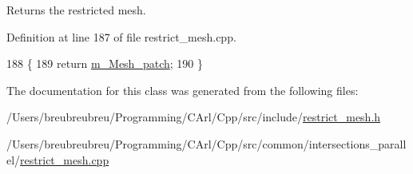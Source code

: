 Returns the restricted mesh. 



Definition at line 187 of file restrict\+\_\+mesh.\+cpp.


\begin{DoxyCode}
188 \{
189     \textcolor{keywordflow}{return} \hyperlink{classcarl_1_1_patch__construction_a4dfae5a2c4a983ac31dacec1cdb29d11}{m\_Mesh\_patch};
190 \}
\end{DoxyCode}


The documentation for this class was generated from the following files\+:\begin{DoxyCompactItemize}
\item 
/\+Users/breubreubreu/\+Programming/\+C\+Arl/\+Cpp/src/include/\hyperlink{restrict__mesh_8h}{restrict\+\_\+mesh.\+h}\item 
/\+Users/breubreubreu/\+Programming/\+C\+Arl/\+Cpp/src/common/intersections\+\_\+parallel/\hyperlink{restrict__mesh_8cpp}{restrict\+\_\+mesh.\+cpp}\end{DoxyCompactItemize}
